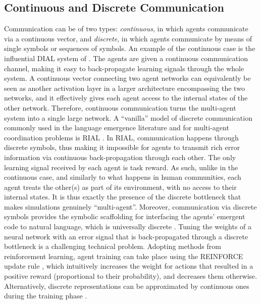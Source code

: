 \subsection{Continuous and Discrete Communication}
\label{sec:discrete-continuous}
 Communication can be of two types:
  \textit{continuous}, in which agents communicate via a continuous
  vector, and \textit{discrete}, in which agents
  communicate by means of single symbols or sequences of symbols.
An example of the continuous case is the influential DIAL system of . The agents are given a continuous communication channel, making it easy to back-propagate learning signals through the whole system. A continuous vector connecting two agent networks can equivalently be seen as another activation layer in a larger
architecture encompassing the two networks, and it effectively gives each agent access to the internal states of the other network. Therefore, continuous communication turns the multi-agent system into a single large network.  
A ``vanilla'' model of discrete communication commonly used in the language emergence literature and for multi-agent coordination problems is RIAL \cite{Foerster:etal:2016}. In RIAL, communication happens through discrete symbols, thus making it impossible for agents to transmit rich error information via continuous back-propagation through each other. The only learning signal received by each agent is task reward. As such, unlike in the continuous case, and similarly to what happens in human communities, each agent treats the other(s) as part of its environment, with no access to their internal states. It is thus exactly the presence of the discrete bottleneck that makes simulations genuinely ``multi-agent''.  Moreover, communication via discrete symbols provides the symbolic scaffolding for interfacing the agents' emergent code to natural language,  which is universally discrete \cite{Hockett:1960}.
Tuning the weights of a neural network with an error signal that is back-propagated through a discrete bottleneck is a challenging technical problem. Adopting methods from reinforcement learning, agent training can take place using the REINFORCE update rule \cite{Williams:1992,Lazaridou:etal:2017}, which intuitively increases the weight for actions that resulted in a positive  reward  (proportional to their probability), and decreases them otherwise. Alternatively, discrete representations can be approximated by continuous ones during the training  phase \cite{Havrylov:Titov:2017,Jang:etal:2017,Maddison:etal:2017}.

